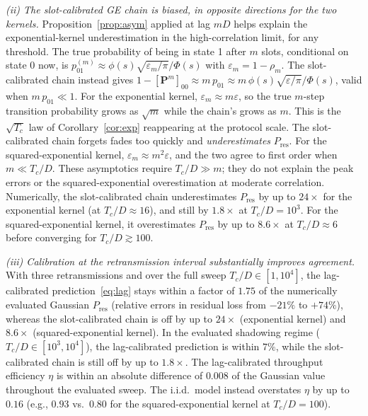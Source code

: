 \documentclass[conference]{IEEEtran}
\newcommand{\pres}{P_{\mathrm{res}}}
\begin{document}
\emph{(ii) The slot-calibrated GE chain is biased, in opposite directions for the two kernels.} Proposition~\ref{prop:asym} applied at lag $mD$ helps explain the exponential-kernel underestimation in the high-correlation limit, for any threshold. The true probability of being in state 1 after $m$ slots, conditional on state 0 now, is $p^{(m)}_{01}\approx\phi(s)\sqrt{\varepsilon_m/\pi}/\Phi(s)$ with $\varepsilon_m=1-\rho_m$. The slot-calibrated chain instead gives $1-[\mathbf{P}^m]_{00}\approx m\,p_{01}\approx m\,\phi(s)\sqrt{\varepsilon/\pi}/\Phi(s)$, valid when $m\,p_{01}\ll1$. For the exponential kernel, $\varepsilon_m\approx m\varepsilon$, so the true $m$-step transition probability grows as $\sqrt m$ while the chain's grows as $m$. This is the $\sqrt{T_c}$ law of Corollary~\ref{cor:exp} reappearing at the protocol scale. The slot-calibrated chain forgets fades too quickly and \emph{underestimates} $\pres$. For the squared-exponential kernel, $\varepsilon_m\approx m^2\varepsilon$, and the two agree to first order when $m\ll T_c/D$. These asymptotics require $T_c/D\gg m$; they do not explain the peak errors or the squared-exponential overestimation at moderate correlation. Numerically, the slot-calibrated chain underestimates $\pres$ by up to $24\times$ for the exponential kernel (at $T_c/D\approx16$), and still by $1.8\times$ at $T_c/D=10^3$. For the squared-exponential kernel, it overestimates $\pres$ by up to $8.6\times$ at $T_c/D\approx6$ before converging for $T_c/D\gtrsim100$.

\emph{(iii) Calibration at the retransmission interval substantially improves agreement.} With three retransmissions and over the full sweep $T_c/D\in[1,10^4]$, the lag-calibrated prediction~\eqref{eq:lag} stays within a factor of $1.75$ of the numerically evaluated Gaussian $\pres$ (relative errors in residual loss from $-21\%$ to $+74\%$), whereas the slot-calibrated chain is off by up to $24\times$ (exponential kernel) and $8.6\times$ (squared-exponential kernel). In the evaluated shadowing regime ($T_c/D\in[10^3,10^4]$), the lag-calibrated prediction is within $7\%$, while the slot-calibrated chain is still off by up to $1.8\times$. The lag-calibrated throughput efficiency $\eta$ is within an absolute difference of $0.008$ of the Gaussian value throughout the evaluated sweep. The i.i.d.\ model instead overstates $\eta$ by up to $0.16$ (e.g., $0.93$ vs.\ $0.80$ for the squared-exponential kernel at $T_c/D=100$).
\end{document}
